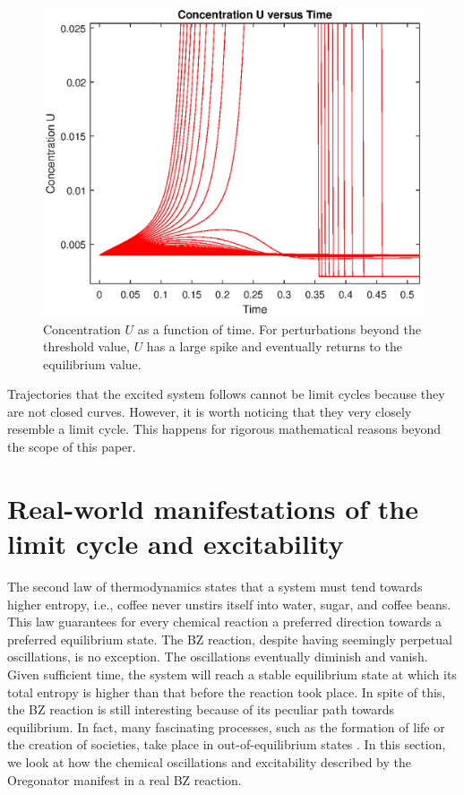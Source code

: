 \documentclass[twocolumn,amsmath,amssymb,aps]{revtex4}
\begin{document}
\begin{figure}[!htb]
	\centering
	\includegraphics[scale=0.5]{UvTime.eps}
	\caption{Concentration $U$ as a function of time. For perturbations beyond the threshold value, $U$ has a large spike and eventually returns to the equilibrium value.}
	\label{fig:Excite4}
\end{figure}

Trajectories that the excited system follows cannot be limit cycles because they are not closed curves. However, it is worth noticing that they very closely resemble a limit cycle. This happens for rigorous mathematical reasons beyond the scope of this paper. 





\section{Real-world manifestations of the limit cycle and excitability}

The second law of thermodynamics states that a system must tend towards higher entropy, i.e., coffee never unstirs itself into water, sugar, and coffee beans. This law guarantees for every chemical reaction a preferred direction towards a preferred equilibrium state. The BZ reaction, despite having seemingly perpetual oscillations, is no exception. The oscillations eventually diminish and vanish. Given sufficient time, the system will reach a stable equilibrium state at which its total entropy is higher than that before the reaction took place. In spite of this, the BZ reaction is still interesting because of its peculiar path towards equilibrium. In fact, many fascinating processes, such as the formation of life or the creation of societies, take place in out-of-equilibrium states \cite{ball1999self}. In this section, we look at how the chemical oscillations and excitability described by the Oregonator manifest in a real BZ reaction.
\end{document}

